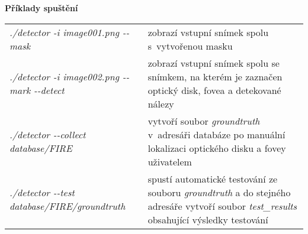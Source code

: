 \bigskip\bigskip
\noindent\textbf{Příklady spuštění}\par\bigskip

\begingroup
\setlength{\tabcolsep}{0pt}
\noindent\begin{tabularx}{\textwidth}{p{8.5cm}X}
  \emph{.{/}detector -i image001.png {-}{-}mask}               & zobrazí vstupní snímek spolu s~vytvořenou masku\\[5mm]
  \emph{.{/}detector -i image002.png {-}{-}mark {-}{-}detect}  & zobrazí vstupní snímek spolu se snímkem, na kterém je zaznačen optický disk, fovea a detekované nálezy\\[5mm]
  \emph{.{/}detector {-}{-}collect database{/}FIRE}            & vytvoří soubor \emph{groundtruth} v~adresáři databáze po manuální lokalizaci optického disku a fovey uživatelem\\[5mm]
  \emph{.{/}detector {-}{-}test database{/}FIRE{/}groundtruth} & spustí automatické testování ze souboru \emph{groundtruth} a do stejného adresáře vytvoří soubor \emph{test\_results} obsahující výsledky testování\\[5mm]
\end{tabularx}
\endgroup